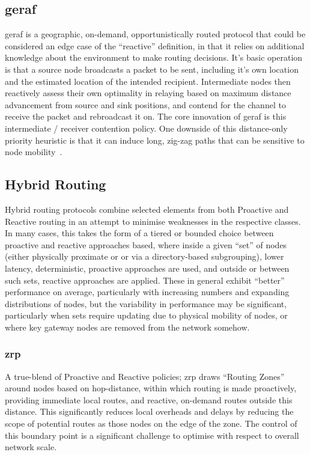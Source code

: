 \subsection{\gls{geraf}}
\gls{geraf} is a geographic, on-demand, opportunistically routed protocol that could be considered an edge case of the ``reactive'' definition, in that it relies on additional knowledge about the environment to make routing decisions.
It's basic operation is that a source node broadcasts a packet to be sent, including it's own location and the estimated location of the intended recipient.
Intermediate nodes then reactively assess their own optimality in relaying based on maximum distance advancement from source and sink positions, and contend for the channel to receive the packet and rebroadcast it on.
The core innovation of \gls{geraf} is this intermediate / receiver contention policy\cite{Zorzi2003,Zorzi2003a}.
One downside of this distance-only priority heuristic is that it can induce long, zig-zag paths that can be sensitive to node mobility~\cite{Jornet2008}.

\subsection{Hybrid Routing}

Hybrid routing protocols combine selected elements from both Proactive and Reactive routing  in an attempt to minimise weaknesses in the respective classes.
In many cases, this takes the form of a tiered or bounded choice between proactive and reactive approaches based, where inside a given ``set'' of nodes (either physically proximate or or via a directory-based subgrouping), lower latency, deterministic, proactive approaches are used, and outside or between such sets, reactive approaches are applied.
These in general exhibit ``better'' performance on average, particularly with increasing numbers and expanding distributions of nodes, but the variability in performance may be significant, particularly when sets require updating due to physical mobility of nodes, or where key gateway nodes are removed from the network somehow. 

\subsubsection{\gls{zrp}}
A true-blend of Proactive and Reactive policies; \gls{zrp} draws ``Routing Zones'' around nodes based on hop-distance, within which routing is made proactively, providing immediate local routes, and reactive, on-demand routes outside this distance. This significantly reduces local overheads and delays by reducing the scope of potential routes as those nodes on the edge of the zone. The control of this boundary point is a significant challenge to optimise with respect to overall network scale. \\
